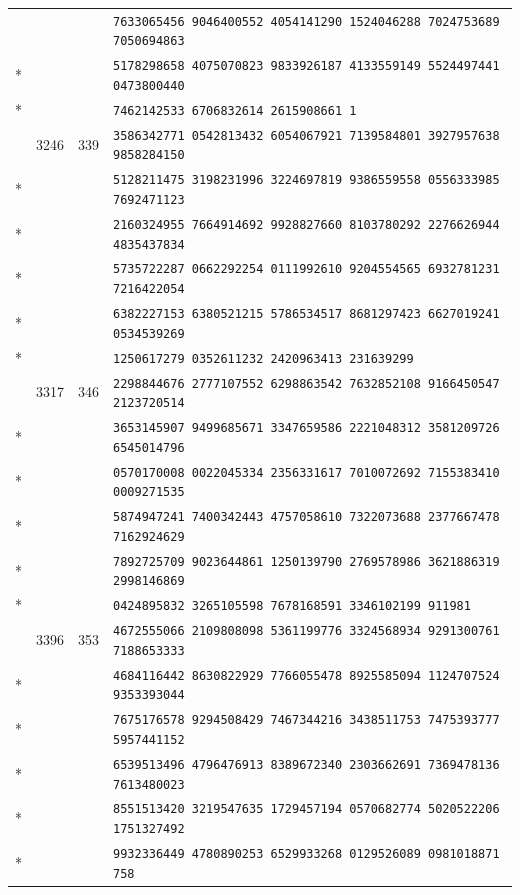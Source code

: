 \documentclass[10pt]{article}
\begin{document}
\begin{longtable}{@{}r@{\quad}r@{\quad}r@{\quad}l@{}}
 & &  & \texttt{7633065456 9046400552 4054141290 1524046288 7024753689 7050694863}\\*
 & &  & \texttt{5178298658 4075070823 9833926187 4133559149 5524497441 0473800440}\\*
 & &  & \texttt{7462142533 6706832614 2615908661 1}\\
\addlinespace[2pt]
73 & 3246 & 339 & \texttt{3586342771 0542813432 6054067921 7139584801 3927957638 9858284150}\\*
 & &  & \texttt{5128211475 3198231996 3224697819 9386559558 0556333985 7692471123}\\*
 & &  & \texttt{2160324955 7664914692 9928827660 8103780292 2276626944 4835437834}\\*
 & &  & \texttt{5735722287 0662292254 0111992610 9204554565 6932781231 7216422054}\\*
 & &  & \texttt{6382227153 6380521215 5786534517 8681297423 6627019241 0534539269}\\*
 & &  & \texttt{1250617279 0352611232 2420963413 231639299}\\
\addlinespace[2pt]
74 & 3317 & 346 & \texttt{2298844676 2777107552 6298863542 7632852108 9166450547 2123720514}\\*
 & &  & \texttt{3653145907 9499685671 3347659586 2221048312 3581209726 6545014796}\\*
 & &  & \texttt{0570170008 0022045334 2356331617 7010072692 7155383410 0009271535}\\*
 & &  & \texttt{5874947241 7400342443 4757058610 7322073688 2377667478 7162924629}\\*
 & &  & \texttt{7892725709 9023644861 1250139790 2769578986 3621886319 2998146869}\\*
 & &  & \texttt{0424895832 3265105598 7678168591 3346102199 911981}\\
\addlinespace[2pt]
75 & 3396 & 353 & \texttt{4672555066 2109808098 5361199776 3324568934 9291300761 7188653333}\\*
 & &  & \texttt{4684116442 8630822929 7766055478 8925585094 1124707524 9353393044}\\*
 & &  & \texttt{7675176578 9294508429 7467344216 3438511753 7475393777 5957441152}\\*
 & &  & \texttt{6539513496 4796476913 8389672340 2303662691 7369478136 7613480023}\\*
 & &  & \texttt{8551513420 3219547635 1729457194 0570682774 5020522206 1751327492}\\*
 & &  & \texttt{9932336449 4780890253 6529933268 0129526089 0981018871 758}\\

\end{longtable}
\end{document}
